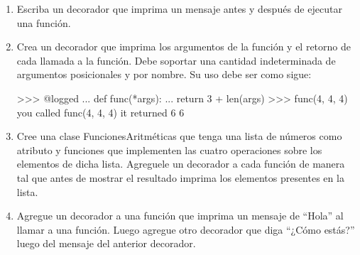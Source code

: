 \begin{enumerate}

\item Escriba un decorador que imprima un mensaje antes y después de ejecutar una función.

\item Crea un decorador que imprima los argumentos de la función y el retorno de cada llamada a la función. Debe soportar una cantidad indeterminada de argumentos posicionales y por nombre. Su uso debe ser como sigue:

\begin{pyglist} [language=python]
>>> @logged
... def func(*args):
...     return 3 + len(args)
>>> func(4, 4, 4)
you called func(4, 4, 4)
it returned 6
6
\end{pyglist}

\item Cree una clase FuncionesAritméticas que tenga una lista de números como atributo y funciones que implementen las cuatro operaciones sobre los elementos de dicha lista. Agreguele un decorador a cada función de manera tal que antes de mostrar el resultado imprima los elementos presentes en la lista.

\item Agregue un decorador a una función que imprima un mensaje de ``Hola'' al llamar a una función. Luego agregue otro decorador que diga ``¿Cómo estás?'' luego del mensaje del anterior decorador.

\end{enumerate}